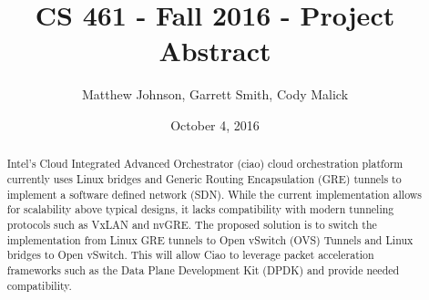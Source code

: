 \documentclass[10pt,letterpaper,onecolumn,draftclsnofoot]{IEEEtran}
\begin{document}
\begin{titlepage}
  \title{CS 461 - Fall 2016 - Project Abstract}
  \author{Matthew Johnson, Garrett Smith, Cody Malick}
  \date{October 4, 2016}
  \maketitle
  \vspace{4cm}
  \begin{abstract}
  	\noindent Intel's Cloud Integrated Advanced Orchestrator (ciao) cloud
	orchestration platform currently uses Linux bridges and Generic Routing
	Encapsulation (GRE) tunnels to implement a software defined network
	(SDN). While the current implementation allows for scalability above
	typical designs, it lacks compatibility with modern tunneling protocols
	such as VxLAN and nvGRE. The proposed solution is to switch the
	implementation from Linux GRE tunnels to Open vSwitch (OVS) Tunnels and
	Linux bridges to Open vSwitch. This will allow Ciao to leverage packet
	acceleration frameworks such as the Data Plane Development Kit (DPDK)
	and provide needed compatibility.
  \end{abstract}
\end{titlepage}
\end{document}
